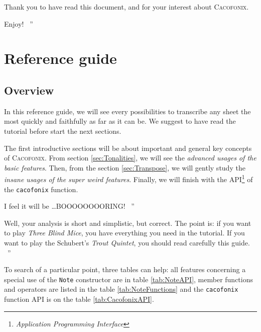 \documentclass{article}
\newcommand{\cacofonix}{\textsc{Cacofonix}\xspace}
\newcommand{\note}{\lstinline!Note!\xspace}
\newenvironment{meenv}{ \par \noindent \makebox[6em][r]{ \textcolor{mecolor}{Me}: `` --~}}{~''}
\newenvironment{myselfenv}{ \par \noindent \makebox[6em][r]{ \textcolor{myselfcolor}{Myself}: `` --~}}{~''}
\newcommand{ \me }[1]{%
\begin{meenv}%
	#1%
\end{meenv} }
\newcommand{ \myself }[1]{%
\begin{myselfenv}%
	#1%
\end{myselfenv} }
\begin{document}
Thank you to have read this document, and for your interest about \cacofonix.

\myself{Enjoy!}

\section{Reference guide}

\subsection{Overview}

In this reference guide, we will see every possibilities to transcribe any sheet the most quickly and faithfully as far as it can be. We suggest to have read the tutorial before start the next sections.

The first introductive sections will be about important and general key concepts of \cacofonix. From section \ref{sec:Tonalities}, we will see the \emph{advanced usages of the basic features}. Then, from the section \ref{sec:Transpose}, we will gently study the \emph{insane usages of the super weird features}. Finally, we will finish with the API\footnote{\emph{Application Programming Interface}} of the \lstinline!cacofonix! function.

\me{I feel it will be \dots BOOOOOOOORING!}
\myself{Well, your analysis is short and simplistic, but correct. The point is: if you want to play \emph{Three Blind Mice}, you have everything you need in the tutorial. If you want to play the Schubert's \emph{Trout Quintet}, you should read carefully this guide.}

To search of a particular point, three tables can help: all features concerning a special use of the \note constructor are in table \ref{tab:NoteAPI}, member functions and operators are listed in the table \ref{tab:NoteFunctions} and the \lstinline!cacofonix! function API is on the table \ref{tab:CacofonixAPI}.
\end{document}
